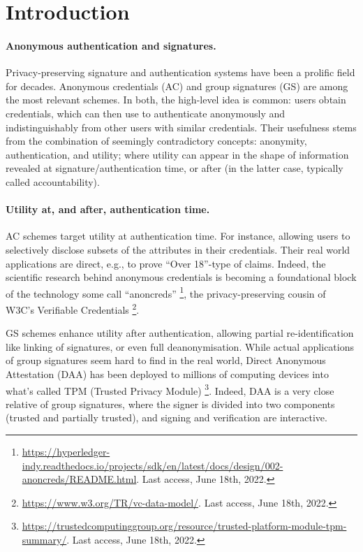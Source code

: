 \section{Introduction}
\label{sec:introduction}


\paragraph{Anonymous authentication and signatures.} %
Privacy-preserving signature and authentication systems have been a prolific
field for decades. Anonymous credentials (AC) \cite{chau85} and group signatures
(GS) \cite{ch91} are among the most relevant schemes. In both, the
high-level idea is common: users obtain credentials, which can then use to
authenticate anonymously and indistinguishably from other users with similar
credentials. 
%
Their usefulness stems from the combination of seemingly contradictory concepts:
anonymity, authentication, and utility; where utility can appear in the shape of
information revealed at signature/authentication time, or after (in the latter
case, typically called accountability).

\paragraph{Utility at, and after, authentication time.} %
AC schemes target utility at authentication time. For instance, allowing
users to selectively disclose subsets of the attributes in their credentials.
Their real world applications are direct, e.g., to prove ``Over 18''-type of
claims. Indeed, the scientific research behind anonymous credentials is becoming
a foundational block of the technology some call ``anoncreds''%
\footnote{\url{https://hyperledger-indy.readthedocs.io/projects/sdk/en/latest/docs/design/002-anoncreds/README.html}. Last access, June 18th, 2022.},
the privacy-preserving cousin of W3C's Verifiable Credentials%
\footnote{\url{https://www.w3.org/TR/vc-data-model/}. Last access, June 18th,
  2022.}.

GS schemes enhance utility after authentication, allowing partial
re-identification like linking of signatures, or even full deanonymisation.
While actual applications of group signatures seem hard to find in the real
world, Direct Anonymous Attestation (DAA) \cite{bcc04,bl07,cdl16b} has been
deployed to millions of computing devices into what's called TPM (Trusted
Privacy Module)%
\footnote{\url{https://trustedcomputinggroup.org/resource/trusted-platform-module-tpm-summary/}. Last access, June 18th, 2022.}.
Indeed, DAA is a very close relative of group signatures, where the signer is
divided into two components (trusted and partially trusted), and signing
and verification are interactive.

